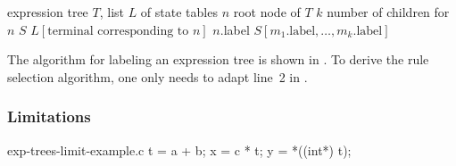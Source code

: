 \begin{algorithm}[t]
               {expression tree $T$, list $L$ of state tables}%
  {%
    $n$ \Assign root node of $T$\;
    $k$ \Assign number of children for $n$\;
    $S$ \Assign $L[\text{terminal corresponding to $n$}]$\;
    $n$.label \Assign $S[m_1.\text{label}, \ldots, m_k.\text{label}]$\;
  }

  \caption[%
            Algorithm for labeling an expression tree for optimal pattern
            selection%
          ]{%
            Labels an expression tree for optimal pattern selection%
          }
\end{algorithm}

The algorithm for labeling an \gls{expression tree} is shown in
.
%
To derive the \gls{rule} selection algorithm, one only needs to adapt line~2 in
.



\subsubsection{Limitations}

\begin{filecontents*}{exp-trees-limit-example.c}
t = a + b;
x = c * t;
y = *((int*) t);
\end{filecontents*}

